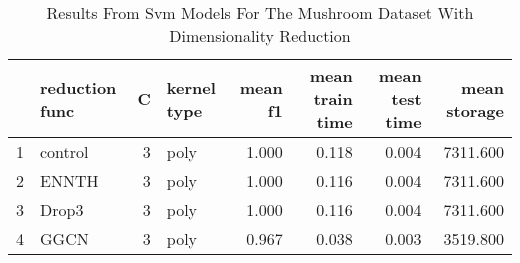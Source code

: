 \begin{table}
\centering
\caption{Results From Svm Models For The Mushroom Dataset With Dimensionality Reduction}
\label{tab:svm_reduction_results_mushroom}
\begin{tabular}{rlrlrrrr}
\toprule
 & reduction func & C & kernel type & mean f1 & mean train time & mean test time & mean storage \\
\midrule
1 & control & 3 & poly & 1.000 & 0.118 & 0.004 & 7311.600 \\
2 & ENNTH & 3 & poly & 1.000 & 0.116 & 0.004 & 7311.600 \\
3 & Drop3 & 3 & poly & 1.000 & 0.116 & 0.004 & 7311.600 \\
4 & GGCN & 3 & poly & 0.967 & 0.038 & 0.003 & 3519.800 \\
\bottomrule
\end{tabular}
\end{table}
